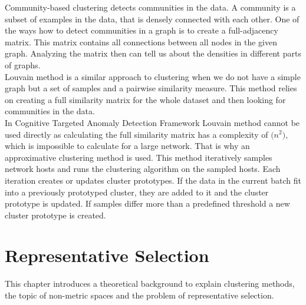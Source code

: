 \documentclass[thesis=B,english]{FITthesis}[2012/10/20]
\begin{document}
Community-based clustering detects communities in the data.
A community is a subset of examples in the data, that is densely connected with each other.
One of the ways how to detect communities in a graph is to create a full-adjacency matrix.
This matrix contains all connections between all nodes in the given graph.
Analyzing the matrix then can tell us about the densities in different parts of graphs.\\

Louvain method is a similar approach to clustering when we do not have a simple graph but a set of samples and a pairwise similarity measure.
This method relies on creating a full similarity matrix for the whole dataset and then looking for communities in the data. \\

In Cognitive Targeted Anomaly Detection Framework Louvain method cannot be used directly as calculating the full similarity matrix has a complexity of $\mathcal(n^2)$, which is impossible to calculate for a large network.
That is why an approximative clustering method is used.
This method iteratively samples network hosts and runs the clustering algorithm on the sampled hosts.
Each iteration creates or updates cluster prototypes.
If the data in the current batch fit into a previously prototyped cluster, they are added to it and the cluster prototype is updated.
If samples differ more than a predefined threshold a new cluster prototype is created.


\chapter{Representative Selection}

This chapter introduces a theoretical background to explain clustering methods, the topic of non-metric spaces and the problem of representative selection.
\end{document}
